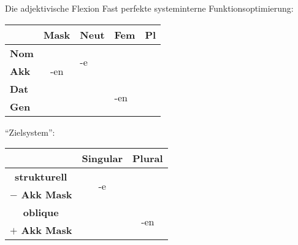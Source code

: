 \begin{frame}
  {Die adjektivische Flexion}
  \pause
  Fast perfekte systeminterne Funktionsoptimierung:\\
  \Zeile
  \pause
  \begin{center}
    \begin{tabular}{|l|llll|}
      \cline{2-5}
      \multicolumn{1}{c|}{}& \textbf{Mask} & \textbf{Neut} & \textbf{Fem} & \textbf{Pl} \\
      \hline
      \textbf{Nom} && \multirow{2}{*}{-e} & \multicolumn{1}{c|}{} & \\ \cline{2-2}
      \textbf{Akk} & \multicolumn{1}{c|}{-en} && \multicolumn{1}{c|}{} & \\ \cline{2-4}
      \textbf{Dat} &&& \multirow{2}{*}{-en} & \\
      \textbf{Gen} &&&& \\
      \hline
    \end{tabular}
  \end{center}
  \pause
  "`Zielsystem"':\\
  \begin{center}
    \begin{tabular}{|l|c|c|}
      \cline{2-3}
      \multicolumn{1}{c|}{} & \multicolumn{1}{c|}{\textbf{Singular}} & \multicolumn{1}{c|}{\textbf{Plural}} \\
      \hline
      \multicolumn{1}{|c|}{\textbf{strukturell}} & \multirow{2}{*}{-e} &  \\
      \multicolumn{1}{|c|}{\textbf{$-$ Akk Mask}} &  &  \\
      \cline{1-2}
      \multicolumn{1}{|c|}{\textbf{oblique}} & \multicolumn{1}{c}{} & \multirow{2}{*}{-en} \\
      \multicolumn{1}{|c|}{\textbf{$+$ Akk Mask}} & \multicolumn{1}{c}{} & \\
      \hline
    \end{tabular}
  \end{center}
\end{frame}


